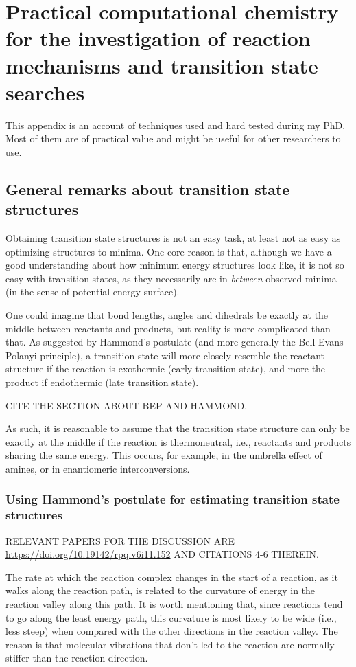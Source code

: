\chapter{Practical computational chemistry for the investigation of reaction
mechanisms and transition state searches}%
\label{ch:tutorial}

This appendix is an account of techniques used and hard tested during my PhD.
Most of them are of practical value and might be useful for other researchers
to use.

\section{General remarks about transition state structures}

Obtaining transition state structures is not an easy task, at least not as easy
as optimizing structures to minima.
One core reason is that, although we have a good understanding about how
minimum energy structures look like, it is not so easy with transition states,
as they necessarily are in \emph{between} observed minima (in the sense of
potential energy surface).

One could imagine that bond lengths, angles and dihedrals be exactly at the
middle between reactants and products, but reality is more complicated than
that.
As suggested by Hammond's postulate (and more generally the Bell-Evans-Polanyi
principle), a transition state will more closely resemble the reactant
structure if the reaction is exothermic (early transition state), and more the
product if endothermic (late transition state).

CITE THE SECTION ABOUT BEP AND HAMMOND.

As such, it is reasonable to assume that the transition state structure can
only be exactly at the middle if the reaction is thermoneutral, i.e., reactants
and products sharing the same energy.
This occurs, for example, in the umbrella effect of amines, or in enantiomeric
interconversions.

\subsection{Using Hammond's postulate for estimating transition state
structures}

RELEVANT PAPERS FOR THE DISCUSSION ARE
\url{https://doi.org/10.19142/rpq.v6i11.152} AND CITATIONS 4-6 THEREIN.

The rate at which the reaction complex changes in the start of a reaction, as
it walks along the reaction path, is related to the curvature of energy in the
reaction valley along this path.
It is worth mentioning that, since reactions tend to go along the least energy
path, this curvature is most likely to be wide (i.e., less steep) when compared
with the other directions in the reaction valley.
The reason is that molecular vibrations that don't led to the reaction are
normally stiffer than the reaction direction.

